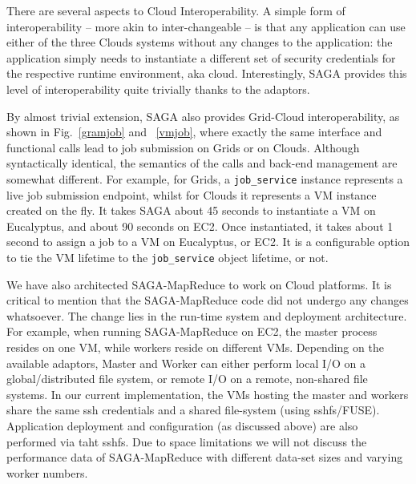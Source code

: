 \documentclass[conference,final]{IEEEtran}
\newcommand{\sagamapreduce }{SAGA-MapReduce }
\begin{document}
There are several aspects to Cloud Interoperability. A simple form of
interoperability -- more akin to inter-changeable -- is that any
application can use either of the three Clouds systems without any
changes to the application: the application simply needs to
instantiate a different set of security credentials for the respective
runtime environment, aka cloud.  Interestingly, SAGA provides this level of
interoperability quite trivially thanks to the adaptors.

By almost
trivial extension, SAGA also provides Grid-Cloud interoperability, as shown
in Fig.~\ref{gramjob} and ~\ref{vmjob}, where exactly the same
interface and functional calls lead to job submission on Grids or on
Clouds. Although syntactically identical, the semantics of the calls
and back-end management are somewhat different.  For example, for
Grids, a \texttt{job\_service} instance represents a live job
submission endpoint, whilst for Clouds it represents a VM
instance created on the fly.  It takes SAGA about 45 seconds to
instantiate a VM on Eucalyptus, and about 90 seconds on EC2. Once
instantiated, it takes about 1 second to assign a job to a VM on
Eucalyptus, or EC2.  It is a configurable option to tie the VM
lifetime to the \texttt{job\_service} object lifetime, or not.

We have also architected \sagamapreduce to work on Cloud platforms.  It
is critical to mention that the \sagamapreduce code did not undergo
any changes whatsoever. The change lies in the run-time system and
deployment architecture. For example, when running \sagamapreduce on
EC2, the master process resides on one VM, while workers reside on
different VMs.
Depending on the available adaptors, Master and Worker can either 
perform local I/O on a global/distributed file system, or remote 
I/O on a remote, non-shared file systems.  In our current implementation, 
the VMs hosting the master and workers share the same ssh
credentials and a shared file-system (using sshfs/FUSE).  Application
deployment and configuration (as discussed above) are also performed
via taht sshfs.
Due to space limitations we will not
discuss the performance data of \sagamapreduce with different data-set
sizes and varying worker numbers.


\end{document}
